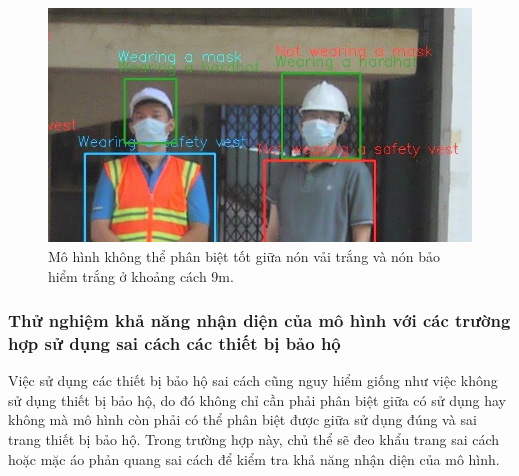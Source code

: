 \begin{figure}[ht!]
	\centerline{\includegraphics[scale=0.8]{images/bad_hh_9m_zoom.jpg}}
  	\caption{Mô hình không thể phân biệt tốt giữa nón vải trắng và nón bảo hiểm trắng ở khoảng cách 9m.}
  	\label{fig:good_hh_9m_zoom}
\end{figure}

\subsubsection{Thử nghiệm khả năng nhận diện của mô hình với các trường hợp sử dụng sai cách các thiết bị bảo hộ}
Việc sử dụng các thiết bị bảo hộ sai cách cũng nguy hiểm giống như việc không sử dụng thiết bị bảo hộ, do đó không chỉ cần phải phân biệt giữa có sử dụng hay không mà mô hình còn phải có thể phân biệt được giữa sử dụng đúng và sai trang thiết bị bảo hộ. Trong trường hợp này, chủ thể sẽ đeo khẩu trang sai cách hoặc mặc áo phản quang sai cách để kiểm tra khả năng nhận diện của mô hình.

